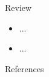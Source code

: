 \documentclass{beamer}
\begin{document}
\begin{frame}{Review}

\begin{itemize}
  \itemsep10pt
  \item ...
  \item ...
\end{itemize}

\end{frame}


\setbeamercovered{}
\beamerdefaultoverlayspecification{}

\begin{frame}[c,allowframebreaks]{References}

\small

\nocite{*}

\itemize

\end{frame}

\end{document}
